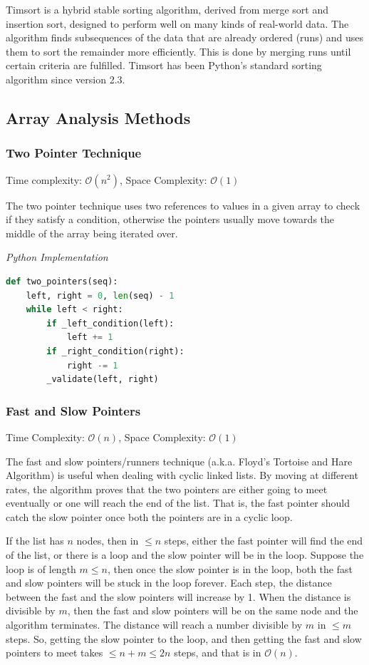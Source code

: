 \documentclass{article}
\newcommand{\bigO}{\mathcal{O}}
\begin{document}
    Timsort is a hybrid stable sorting algorithm, derived from merge sort and insertion sort, designed to perform well on many kinds of real-world data. The algorithm finds subsequences of the data that are already ordered (runs) and uses them to sort the remainder more efficiently. This is done by merging runs until certain criteria are fulfilled. Timsort has been Python's standard sorting algorithm since version 2.3.
    
    \subsection{Array Analysis Methods}
    
    \subsubsection{Two Pointer Technique}
    Time complexity: $\bigO(n^2)$, Space Complexity: $\bigO(1)$
    
    The two pointer technique uses two references to values in a given array to check if they satisfy a condition, otherwise the pointers usually move towards the middle of the array being iterated over.
    
\vspace{8pt} \emph{Python Implementation}
\begin{lstlisting}[language=Python]
def two_pointers(seq):
    left, right = 0, len(seq) - 1
    while left < right:
        if _left_condition(left):
            left += 1
        if _right_condition(right):
            right -= 1
        _validate(left, right)
\end{lstlisting}
    
    \subsubsection{Fast and Slow Pointers}
    Time Complexity: $\bigO(n)$, Space Complexity: $\bigO(1)$
    
    The fast and slow pointers/runners technique (a.k.a. Floyd’s Tortoise and Hare Algorithm) is useful when dealing with cyclic linked lists. By moving at different rates, the algorithm proves that the two pointers are either going to meet eventually or one will reach the end of the list. That is, the fast pointer should catch the slow pointer once both the pointers are in a cyclic loop. 
    
    If the list has $n$ nodes, then in $\leq n$ steps, either the fast pointer will find the end of the list, or there is a loop and the slow pointer will be in the loop. Suppose the loop is of length $m \leq n$, then once the slow pointer is in the loop, both the fast and slow pointers will be stuck in the loop forever. Each step, the distance between the fast and the slow pointers will increase by 1. When the distance is divisible by $m$, then the fast and slow pointers will be on the same node and the algorithm terminates. The distance will reach a number divisible by $m$ in $\leq m$ steps. So, getting the slow pointer to the loop, and then getting the fast and slow pointers to meet takes $\leq n + m \leq 2n$ steps, and that is in $\bigO(n)$.
\end{document}

